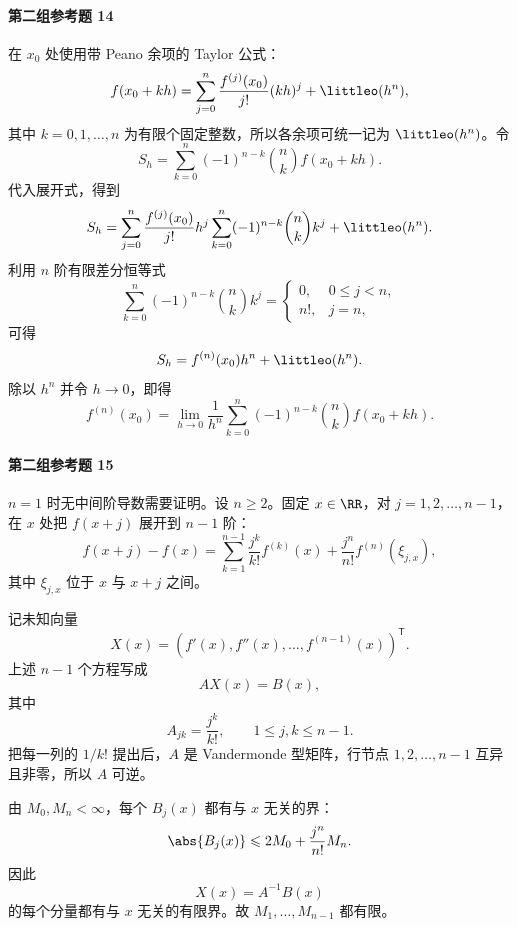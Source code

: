 \paragraph{第二组参考题 14}
\begin{xsolution}
在 $x_0$ 处使用带 Peano 余项的 Taylor 公式：
\[
  f(x_0+kh)
  =\sum_{j=0}^n\frac{f^{(j)}(x_0)}{j!}(kh)^j
   +\littleo(h^n),
\]
其中 $k=0,1,\ldots,n$ 为有限个固定整数，所以各余项可统一记为 $\littleo(h^n)$。令
\[
  S_h=\sum_{k=0}^n(-1)^{n-k}\binom nk f(x_0+kh).
\]
代入展开式，得到
\[
  S_h=\sum_{j=0}^n\frac{f^{(j)}(x_0)}{j!}h^j
  \sum_{k=0}^n(-1)^{n-k}\binom nk k^j
  +\littleo(h^n).
\]
利用 $n$ 阶有限差分恒等式
\[
  \sum_{k=0}^n(-1)^{n-k}\binom nk k^j
  =
  \begin{cases}
    0,&0\leqslant j<n,\\
    n!,&j=n,
  \end{cases}
\]
可得
\[
  S_h=f^{(n)}(x_0)h^n+\littleo(h^n).
\]
除以 $h^n$ 并令 $h\to0$，即得
\[
  f^{(n)}(x_0)
  =\lim_{h\to0}\frac1{h^n}
   \sum_{k=0}^n(-1)^{n-k}\binom nk f(x_0+kh).
\]
\end{xsolution}

\paragraph{第二组参考题 15}
\begin{xsolution}
$n=1$ 时无中间阶导数需要证明。设 $n\geqslant2$。固定 $x\in\RR$，对 $j=1,2,\ldots,n-1$，在 $x$ 处把 $f(x+j)$ 展开到 $n-1$ 阶：
\[
  f(x+j)-f(x)
  =\sum_{k=1}^{n-1}\frac{j^k}{k!}f^{(k)}(x)
   +\frac{j^n}{n!}f^{(n)}(\xi_{j,x}),
\]
其中 $\xi_{j,x}$ 位于 $x$ 与 $x+j$ 之间。

记未知向量
\[
  X(x)=(f'(x),f''(x),\ldots,f^{(n-1)}(x))^{\mathsf T}.
\]
上述 $n-1$ 个方程写成
\[
  AX(x)=B(x),
\]
其中
\[
  A_{jk}=\frac{j^k}{k!},\qquad1\leqslant j,k\leqslant n-1.
\]
把每一列的 $1/k!$ 提出后，$A$ 是 Vandermonde 型矩阵，行节点 $1,2,\ldots,n-1$ 互异且非零，所以 $A$ 可逆。

由 $M_0,M_n<\infty$，每个 $B_j(x)$ 都有与 $x$ 无关的界：
\[
  \abs{B_j(x)}
  \leqslant2M_0+\frac{j^n}{n!}M_n.
\]
因此
\[
  X(x)=A^{-1}B(x)
\]
的每个分量都有与 $x$ 无关的有限界。故 $M_1,\ldots,M_{n-1}$ 都有限。
\end{xsolution}

